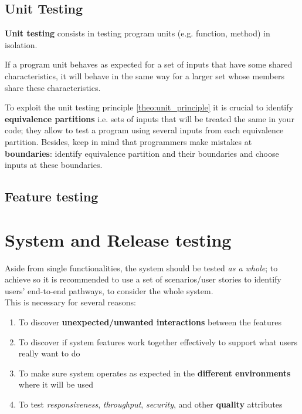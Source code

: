 \subsection{Unit Testing}
\textbf{Unit testing} consists in testing program units (e.g. function, method) in isolation.

\begin{theorem}
   \label{theo:unit_principle}
If a program unit behaves as expected for a set of inputs that have some shared
characteristics, it will behave in the same way for a larger set whose members share
these characteristics.

\end{theorem}

To exploit the unit testing principle \ref{theo:unit_principle} it is crucial to
identify \textbf{equivalence partitions} i.e. sets of inputs that will be treated the same in your code;
they allow to test a program using several inputs from each equivalence partition.
Besides, keep in mind that programmers make mistakes at \textbf{boundaries}: 
identify equivalence partition and their boundaries and choose inputs at these boundaries.

\subsection{Feature testing}

\section{System and Release testing}
Aside from single functionalities, the system should be tested \textit{as a whole};
to achieve so it is recommended to use a set of scenarios/user stories to identify users’ end-to-end pathways,
to consider the whole system.\\
This is necessary for several reasons:
\begin{enumerate}
   \item To discover \textbf{unexpected/unwanted interactions} between the features
   \item To discover if system features work together effectively to support what
   users really want to do
   \item To make sure system operates as expected in the \textbf{different environments}
   where it will be used
   \item To test \textit{responsiveness}, \textit{throughput}, \textit{security}, and other \textbf{quality} attributes
\end{enumerate}

